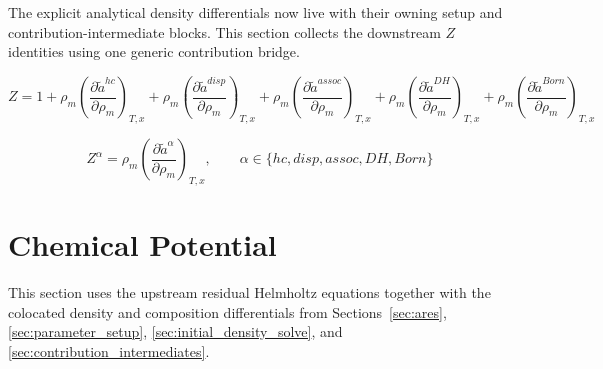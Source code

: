 \documentclass[12pt, letterpaper]{article}
\begin{document}
The explicit analytical density differentials now live with their owning setup and contribution-intermediate blocks. This section collects the downstream \(Z\) identities using one generic contribution bridge.

\begin{equation}
    Z = 1
    + \rho_m\left(\frac{\partial\tilde{a}^{hc}}{\partial\rho_m}\right)_{T,x}
    + \rho_m\left(\frac{\partial\tilde{a}^{disp}}{\partial\rho_m}\right)_{T,x}
    + \rho_m\left(\frac{\partial\tilde{a}^{assoc}}{\partial\rho_m}\right)_{T,x}
    + \rho_m\left(\frac{\partial\tilde{a}^{DH}}{\partial\rho_m}\right)_{T,x}
    + \rho_m\left(\frac{\partial\tilde{a}^{Born}}{\partial\rho_m}\right)_{T,x}
    \label{eq:z_total}
\end{equation}


\begin{equation}
    Z^{\alpha}
    =
    \rho_m\left(\frac{\partial\tilde{a}^{\alpha}}{\partial\rho_m}\right)_{T,x}
    ,
    \qquad
    \alpha\in\{hc,disp,assoc,DH,Born\}
    \label{eq:z_alpha}
\end{equation}

\section{Chemical Potential}
\label{sec:chemical_potential}

This section uses the upstream residual Helmholtz equations together with the colocated density and composition differentials from Sections~\ref{sec:ares}, \ref{sec:parameter_setup}, \ref{sec:initial_density_solve}, and \ref{sec:contribution_intermediates}.

\end{document}
